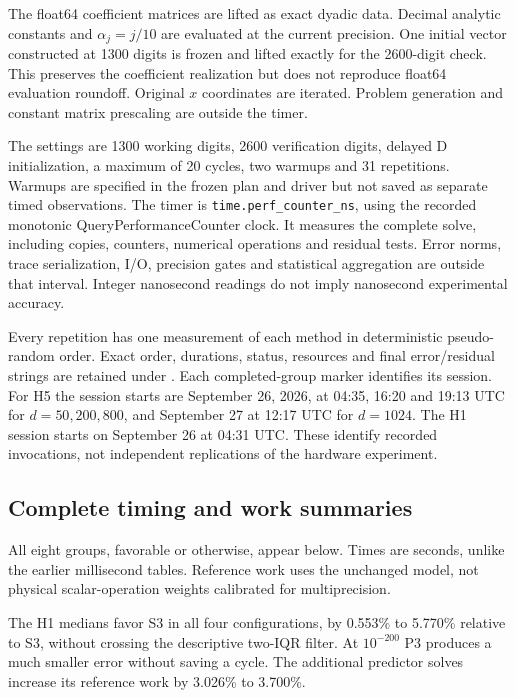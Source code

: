 \documentclass[11pt]{article}
\begin{document}
The float64 coefficient matrices are lifted as exact dyadic data. Decimal analytic constants and $\alpha_j=j/10$ are evaluated at the current precision. One initial vector constructed at 1300 digits is frozen and lifted exactly for the 2600-digit check. This preserves the coefficient realization but does not reproduce float64 evaluation roundoff. Original $x$ coordinates are iterated. Problem generation and constant matrix prescaling are outside the timer.

The settings are 1300 working digits, 2600 verification digits, delayed D initialization, a maximum of 20 cycles, two warmups and 31 repetitions. Warmups are specified in the frozen plan and driver but not saved as separate timed observations. The timer is \texttt{time.perf\_counter\_ns}, using the recorded monotonic QueryPerformanceCounter clock. It measures the complete solve, including copies, counters, numerical operations and residual tests. Error norms, trace serialization, I/O, precision gates and statistical aggregation are outside that interval. Integer nanosecond readings do not imply nanosecond experimental accuracy.

Every repetition has one measurement of each method in deterministic pseudo-random order. Exact order, durations, status, resources and final error/residual strings are retained under . Each completed-group marker identifies its session. For H5 the session starts are September 26, 2026, at 04:35, 16:20 and 19:13 UTC for $d=50,200,800$, and September 27 at 12:17 UTC for $d=1024$. The H1 session starts on September 26 at 04:31 UTC. These identify recorded invocations, not independent replications of the hardware experiment.

\subsection{Complete timing and work summaries}
All eight groups, favorable or otherwise, appear below. Times are seconds, unlike the earlier millisecond tables. Reference work uses the unchanged model, not physical scalar-operation weights calibrated for multiprecision.

\FloatBarrier
The H1 medians favor S3 in all four configurations, by 0.553\% to 5.770\% relative to S3, without crossing the descriptive two-IQR filter. At $10^{-200}$ P3 produces a much smaller error without saving a cycle. The additional predictor solves increase its reference work by 3.026\% to 3.700\%.
\end{document}
